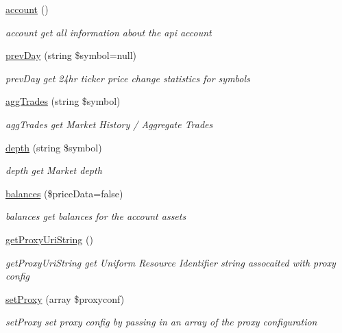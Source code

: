 \begin{DoxyCompactItemize}
\hyperlink{classBinance_1_1API_a14272f6a80009bc8fd742b5f35fee9a5}{account} ()
\begin{DoxyCompactList}\small\item\em account get all information about the api account \end{DoxyCompactList}\item 
\hyperlink{classBinance_1_1API_a884414d58f6297f79afe94a60dc0d794}{prev\-Day} (string \$symbol=null)
\begin{DoxyCompactList}\small\item\em prev\-Day get 24hr ticker price change statistics for symbols \end{DoxyCompactList}\item 
\hyperlink{classBinance_1_1API_af047ce7afeff0729b62fb28b2697ad9f}{agg\-Trades} (string \$symbol)
\begin{DoxyCompactList}\small\item\em agg\-Trades get Market History / Aggregate Trades \end{DoxyCompactList}\item 
\hyperlink{classBinance_1_1API_ac36901dbea220b2401786a6d1bc4d051}{depth} (string \$symbol)
\begin{DoxyCompactList}\small\item\em depth get Market depth \end{DoxyCompactList}\item 
\hyperlink{classBinance_1_1API_afe968feb47f5b68853dae571cb75800c}{balances} (\$price\-Data=false)
\begin{DoxyCompactList}\small\item\em balances get balances for the account assets \end{DoxyCompactList}\item 
\hyperlink{classBinance_1_1API_af1d41534a9f67bc74a6133efa2df4df7}{get\-Proxy\-Uri\-String} ()
\begin{DoxyCompactList}\small\item\em get\-Proxy\-Uri\-String get Uniform Resource Identifier string assocaited with proxy config \end{DoxyCompactList}\item 
\hyperlink{classBinance_1_1API_a3647415e517c745a35d2d54bb27575fe}{set\-Proxy} (array \$proxyconf)
\begin{DoxyCompactList}\small\item\em set\-Proxy set proxy config by passing in an array of the proxy configuration \end{DoxyCompactList}\item 

\end{DoxyCompactItemize}
